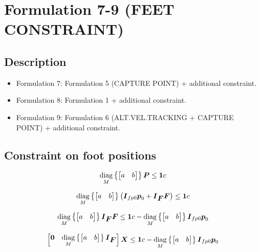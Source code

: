 \section{Formulation 7-9 (FEET CONSTRAINT)}


\subsection{Description}
\begin{itemize}
    \item Formulation 7: Formulation 5 (CAPTURE POINT) + additional constraint.
    \item Formulation 8: Formulation 1 + additional constraint.
    \item Formulation 9: Formulation 6 (ALT.VEL.TRACKING + CAPTURE POINT) + additional constraint.
\end{itemize}



\subsection{Constraint on foot positions}

\begin{equation*}
    \underset{M}{\operatorname{diag}}\left\{\begin{bmatrix} a & b \end{bmatrix}\right\}
    \mbox{\boldmath $P$}
    \le
    \mbox{\boldmath $1$} c
\end{equation*}

\begin{equation*}
    \underset{M}{\operatorname{diag}}\left\{\begin{bmatrix} a & b \end{bmatrix}\right\}
    \left(
        \mbox{\boldmath $I$}_{fp0}
        \mbox{\boldmath $p$}_0
        +
        \mbox{\boldmath $I$}_{\mbox{\boldmath $F$}}
        \mbox{\boldmath $F$}
    \right)
    \le
    \mbox{\boldmath $1$} c
\end{equation*}

\begin{equation*}
    \underset{M}{\operatorname{diag}}\left\{\begin{bmatrix} a & b \end{bmatrix}\right\}
    \mbox{\boldmath $I$}_{\mbox{\boldmath $F$}}
    \mbox{\boldmath $F$}
    \le
    \mbox{\boldmath $1$} c -
    \underset{M}{\operatorname{diag}}\left\{\begin{bmatrix} a & b \end{bmatrix}\right\}
    \mbox{\boldmath $I$}_{fp0}
    \mbox{\boldmath $p$}_0
\end{equation*}


\begin{equation*}
    \begin{bmatrix}
        \mbox{\boldmath $0$} & \underset{M}{\operatorname{diag}}\left\{\begin{bmatrix} a & b \end{bmatrix}\right\} \mbox{\boldmath $I$}_{\mbox{\boldmath $F$}}
    \end{bmatrix}
    \mbox{\boldmath $X$}
    \le
    \mbox{\boldmath $1$} c -
    \underset{M}{\operatorname{diag}}\left\{\begin{bmatrix} a & b \end{bmatrix}\right\}
    \mbox{\boldmath $I$}_{fp0}
    \mbox{\boldmath $p$}_0
\end{equation*}
